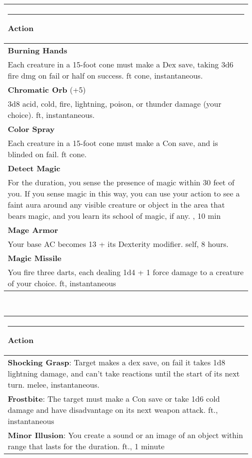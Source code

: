 \documentclass[twocolumn]{article}
\begin{document}
\\
\noindent\begin{tabular}{|m{3.1in}|}
\hline
\rule{1.25in}{0pt}Action\\
\hline
\textbf{Burning Hands}\\
Each creature in a 15-foot cone must make a Dex save, taking 3d6 fire dmg on fail or half on success.  {\sc 15 ft cone, instantaneous}.\\
\textbf{Chromatic Orb} (+5) \\
3d8 acid, cold, fire, lightning, poison, or thunder damage (your choice).  {\sc 90 ft, instantaneous}.\\
\textbf{Color Spray}\\
Each creature in a 15-foot cone must make a Con save, and is blinded on fail.  {\sc 15 ft cone}.\\
\textbf{Detect Magic}\\
For the duration, you sense the presence of magic within 30 feet of you. If you sense magic in this way, you can use your action to see a faint aura around any visible creature or object in the area that bears magic, and you learn its school of magic, if any.  {\sc 30, 10 min}\\
\textbf{Mage Armor}\\
Your base AC becomes 13 + its Dexterity modifier. {\sc self, 8 hours.}\\
\textbf{Magic Missile}\\
You fire three darts, each dealing 1d4 + 1 force damage to a creature of your choice. {\sc 120 ft, instantaneous} \\
\hline
\end{tabular}
\vspace{8pt}

\\
\noindent\begin{tabular}{|m{3.1in}|}
\hline
\rule{1.25in}{0pt}Action\\
\hline
\textbf{Shocking Grasp}: Target makes a dex save, on fail it takes 1d8 lightning damage, and can't take reactions until the start of its next turn. {\sc melee, instantaneous.}\\
\hline
\textbf{Frostbite}: The target must make a Con save or take 1d6 cold damage and have disadvantage on its next weapon attack.  {\sc 60 ft., instantaneous}\\
\hline
\textbf{Minor Illusion}: You create a sound or an image of an object within range that lasts for the duration. {\sc 30 ft., 1 minute}\\
\hline
\end{tabular}
\vspace{8pt}
\end{document}
